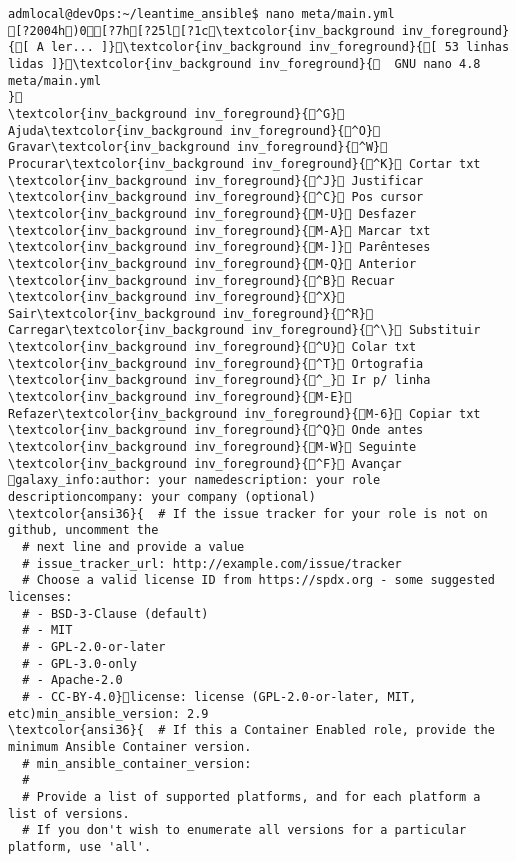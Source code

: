 \documentclass{scrartcl}
\title{}
\begin{document}
\begin{Verbatim}
admlocal@devOps:~/leantime_ansible$ nano meta/main.yml 
[?2004h)0[?7h[?25l[?1c\textcolor{inv_background inv_foreground}{[ A ler... ]}\textcolor{inv_background inv_foreground}{[ 53 linhas lidas ]}\textcolor{inv_background inv_foreground}{  GNU nano 4.8                                                                           meta/main.yml                                                                                        }
\textcolor{inv_background inv_foreground}{^G} Ajuda\textcolor{inv_background inv_foreground}{^O} Gravar\textcolor{inv_background inv_foreground}{^W} Procurar\textcolor{inv_background inv_foreground}{^K} Cortar txt    \textcolor{inv_background inv_foreground}{^J} Justificar    \textcolor{inv_background inv_foreground}{^C} Pos cursor    \textcolor{inv_background inv_foreground}{M-U} Desfazer     \textcolor{inv_background inv_foreground}{M-A} Marcar txt   \textcolor{inv_background inv_foreground}{M-]} Parênteses   \textcolor{inv_background inv_foreground}{M-Q} Anterior     \textcolor{inv_background inv_foreground}{^B} Recuar
\textcolor{inv_background inv_foreground}{^X} Sair\textcolor{inv_background inv_foreground}{^R} Carregar\textcolor{inv_background inv_foreground}{^\} Substituir    \textcolor{inv_background inv_foreground}{^U} Colar txt     \textcolor{inv_background inv_foreground}{^T} Ortografia    \textcolor{inv_background inv_foreground}{^_} Ir p/ linha   \textcolor{inv_background inv_foreground}{M-E} Refazer\textcolor{inv_background inv_foreground}{M-6} Copiar txt   \textcolor{inv_background inv_foreground}{^Q} Onde antes    \textcolor{inv_background inv_foreground}{M-W} Seguinte     \textcolor{inv_background inv_foreground}{^F} Avançar
galaxy_info:author: your namedescription: your role descriptioncompany: your company (optional)
\textcolor{ansi36}{  # If the issue tracker for your role is not on github, uncomment the
  # next line and provide a value
  # issue_tracker_url: http://example.com/issue/tracker
  # Choose a valid license ID from https://spdx.org - some suggested licenses:
  # - BSD-3-Clause (default)
  # - MIT
  # - GPL-2.0-or-later
  # - GPL-3.0-only
  # - Apache-2.0
  # - CC-BY-4.0}license: license (GPL-2.0-or-later, MIT, etc)min_ansible_version: 2.9
\textcolor{ansi36}{  # If this a Container Enabled role, provide the minimum Ansible Container version.
  # min_ansible_container_version:
  #
  # Provide a list of supported platforms, and for each platform a list of versions.
  # If you don't wish to enumerate all versions for a particular platform, use 'all'.

\end{Verbatim}
\end{document}
